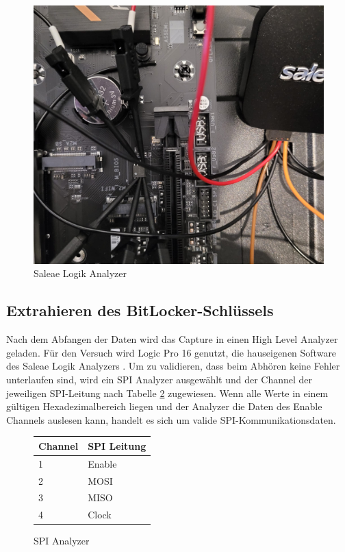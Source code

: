 \documentclass[conference]{IEEEtran}
\begin{document}
\begin{figure}[h!]
	\centering
	\includegraphics[width=1\linewidth]{Salea}
	\caption{Saleae Logik Analyzer}
	\label{fig:saleae}
\end{figure}

\subsection{Extrahieren des BitLocker-Schlüssels}
Nach dem Abfangen der Daten wird das Capture in einen High Level Analyzer geladen. Für den Versuch wird Logic Pro 16 genutzt, die hauseigenen Software des Saleae Logik Analyzers \cite{.13122021}. Um zu validieren, dass beim Abhören keine Fehler unterlaufen sind, wird ein SPI Analyzer ausgewählt und der Channel der jeweiligen SPI-Leitung nach Tabelle \ref{tab:Analyzer} zugewiesen. Wenn alle Werte in einem gültigen Hexadezimalbereich liegen und der Analyzer die Daten des Enable Channels auslesen kann, handelt es sich um valide SPI-Kommunikationsdaten. \pagebreak

\begin{figure}[h!]
	\centering
	\begin{tabular}{| l | l |}
		\hline
		Channel & SPI Leitung \\
		\hline
		1 & Enable \\	
		\hline
		2 & MOSI \\
		\hline
		3 & MISO \\
		\hline
		4 & Clock \\
		\hline
	\end{tabular}
	\caption{SPI Analyzer}
	\label{tab:Analyzer}
\end{figure}
\end{document}
